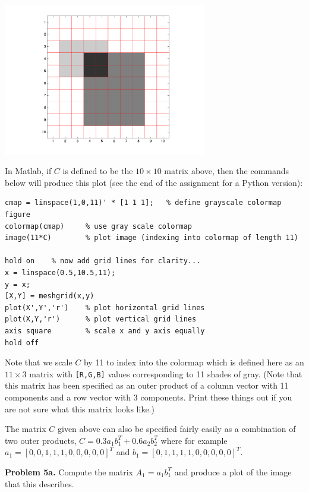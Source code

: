\documentclass[10pt]{article}
\begin{document}
\centerline{\includegraphics[width=3.5in]{image1.png}}

In Matlab, if $C$ is defined to be the $10 \times 10$ matrix above, then the
commands below will produce this plot (see the end of the assignment for a
Python version):

\begin{verbatim}
cmap = linspace(1,0,11)' * [1 1 1];   % define grayscale colormap
figure
colormap(cmap)     % use gray scale colormap
image(11*C)        % plot image (indexing into colormap of length 11)

hold on    % now add grid lines for clarity...
x = linspace(0.5,10.5,11);
y = x;
[X,Y] = meshgrid(x,y)
plot(X',Y','r')    % plot horizontal grid lines
plot(X,Y,'r')      % plot vertical grid lines
axis square        % scale x and y axis equally
hold off
\end{verbatim}

Note that we scale $C$ by 11 to index into the colormap which is defined here
as an $11 \times 3$ matrix with {\tt [R,G,B]} values corresponding to 11
shades of gray.  (Note that this matrix has been specified as an outer product
of a column vector with 11 components and a row vector with 3 components.
Print these things out if you are not sure what this matrix looks like.)

The matrix $C$ given above can also be specified fairly easily as a
combination of two outer products, $C = 0.3a_1b_1^T + 0.6a_2b_2^T$ where
for example $a_1 = [0,0,1,1,1,0,0,0,0,0]^T$ and $b_1 =
[0,1,1,1,1,0,0,0,0,0]^T$.

{\bf Problem 5a.} Compute the matrix $A_1 = a_1b_1^T$ and produce a plot of the image
that this describes.
\end{document}
